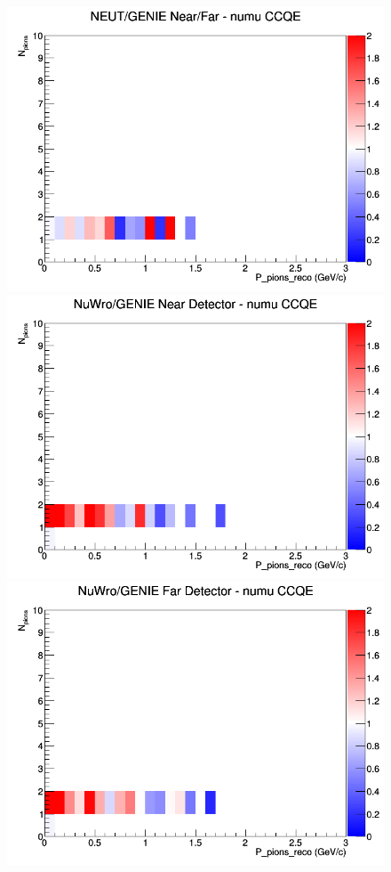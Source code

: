 \documentclass[12pt]{article}
\begin{document}
\begin{figure}[h]
\endminipage
{}
\includegraphics[width=\linewidth]{eff_N_P/LAr/pions/ratios/CCQE_NEUT_GENIE_numu_NF_N_P.png}
\endminipage
\newline
{}
\includegraphics[width=\linewidth]{eff_N_P/LAr/pions/ratios/CCQE_NuWro_GENIE_numu_near_N_P.png}
\endminipage
{}
\includegraphics[width=\linewidth]{eff_N_P/LAr/pions/ratios/CCQE_NuWro_GENIE_numu_far_N_P.png}

\end{figure}
\end{document}
